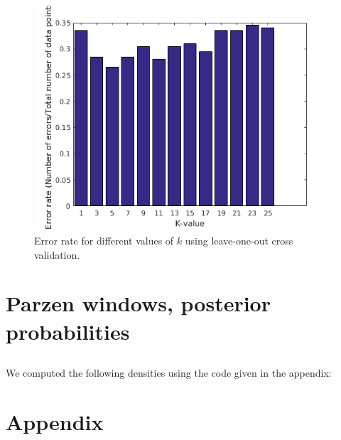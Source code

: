 \documentclass[10pt]{article}
\begin{document}
\begin{figure}[H]
 \centering
 \includegraphics[width=.7\textwidth]{assign2_4_b.png}
 \caption{Error rate for different values of $k$ using leave-one-out cross validation.}
 \label{fig2.4_b}
\end{figure}

\section{Parzen windows, posterior probabilities}
\subsection{}
We computed the following densities using the code given in the appendix:
% 


\section*{Appendix}





\end{document}
